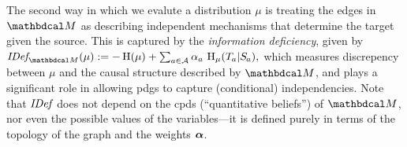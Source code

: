 \documentclass[twoside]{article}
\begin{document}
The second way in which we evalute a distribution $\mu$ is 
treating the edges in ${\dg M}$ as describing independent mechanisms
that determine the target given the source.  
This is captured by the \emph{information deficiency}, given by
$
    \IDef{\dg M}(\mu) := - \H(\mu) + \sum_{a \in \Ar} \alpha_a\, \H_\mu(\Tgt a | \Src a),
$
which
measures discrepency between $\mu$ and the causal structure described by $\dg M$,
    and plays a significant role in allowing pdgs to capture (conditional) independencies.
Note that $\mathit{IDef}_{\!}$ does not depend on the cpds (``quantitative beliefs'') of $\dg M$, nor even the possible values of the variables---it is defined purely in terms of the topology of the graph and the weights $\boldsymbol\alpha$. 
\end{document}
